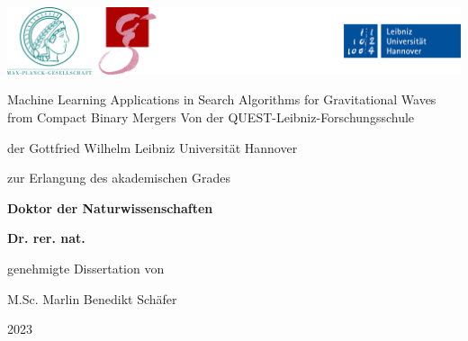\begin{titlepage}
\begin{center}
\includegraphics[width=\textwidth]{assets/logo_band_2.png}\par
\vspace{2cm}

{\Huge{Machine Learning Applications in Search Algorithms for Gravitational Waves from Compact Binary Mergers
}}
\vfill
Von der QUEST-Leibniz-Forschungsschule\par
der Gottfried Wilhelm Leibniz Universität Hannover\par
\vspace{1cm}
zur Erlangung des akademischen Grades\par
\textbf{Doktor der Naturwissenschaften}\par
\textbf{Dr. rer. nat.}\par
\vspace{1cm}
genehmigte Dissertation von\par
\vfill
{\Large{M.Sc. Marlin Benedikt Schäfer}}\par
\vfill
{\Large{2023}}
\end{center}
\end{titlepage}
\clearpage
\thispagestyle{empty}
